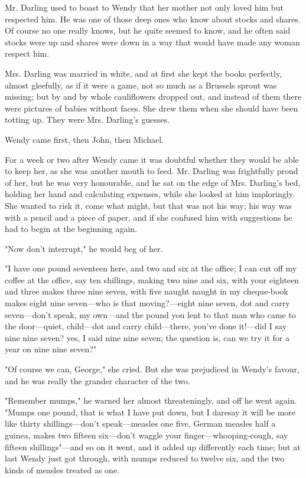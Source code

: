 Mr. Darling used to boast to Wendy that her mother not only loved him but
respected him. He was one of those deep ones who know about stocks and
shares. Of course no one really knows, but he quite seemed to know, and he
often said stocks were up and shares were down in a way that would have
made any woman respect him.


Mrs. Darling was married in white, and at first she kept the books
perfectly, almost gleefully, as if it were a game, not so much as a
Brussels sprout was missing; but by and by whole cauliflowers dropped out,
and instead of them there were pictures of babies without faces. She drew
them when she should have been totting up. They were Mrs. Darling's
guesses.


Wendy came first, then John, then Michael.


For a week or two after Wendy came it was doubtful whether they would be
able to keep her, as she was another mouth to feed. Mr. Darling was
frightfully proud of her, but he was very honourable, and he sat on the
edge of Mrs. Darling's bed, holding her hand and calculating expenses,
while she looked at him imploringly. She wanted to risk it, come what
might, but that was not his way; his way was with a pencil and a piece of
paper, and if she confused him with suggestions he had to begin at the
beginning again.


"Now don't interrupt," he would beg of her.


"I have one pound seventeen here, and two and six at the office; I can cut
off my coffee at the office, say ten shillings, making two nine and six,
with your eighteen and three makes three nine seven, with five naught
naught in my cheque-book makes eight nine seven—who is that moving?—eight
nine seven, dot and carry seven—don't speak, my own—and the
pound you lent to that man who came to the door—quiet, child—dot
and carry child—there, you've done it!—did I say nine nine
seven? yes, I said nine nine seven; the question is, can we try it for a
year on nine nine seven?"


"Of course we can, George," she cried. But she was prejudiced in Wendy's
favour, and he was really the grander character of the two.


"Remember mumps," he warned her almost threateningly, and off he went
again. "Mumps one pound, that is what I have put down, but I daresay it
will be more like thirty shillings—don't speak—measles one
five, German measles half a guinea, makes two fifteen six—don't
waggle your finger—whooping-cough, say fifteen shillings"—and
so on it went, and it added up differently each time; but at last Wendy
just got through, with mumps reduced to twelve six, and the two kinds of
measles treated as one.


